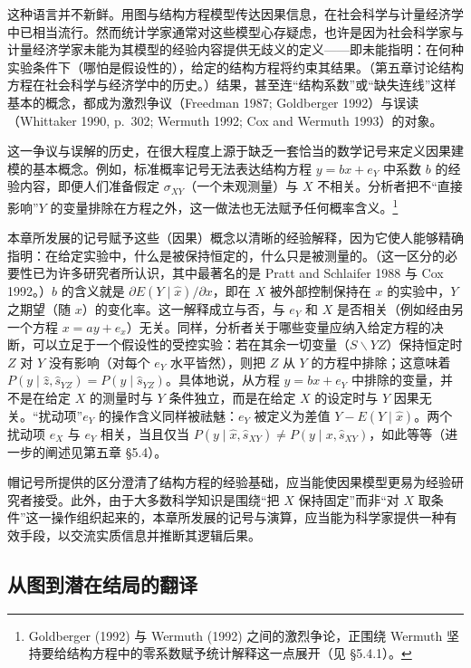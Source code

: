 这种语言并不新鲜。用图与结构方程模型传达因果信息，在社会科学与计量经济学中已相当流行。然而统计学家通常对这些模型心存疑虑，也许是因为社会科学家与计量经济学家未能为其模型的经验内容提供无歧义的定义——即未能指明：在何种实验条件下（哪怕是假设性的），给定的结构方程将约束其结果。（第五章讨论结构方程在社会科学与经济学中的历史。）结果，甚至连“结构系数”或“缺失连线”这样基本的概念，都成为激烈争议（Freedman 1987; Goldberger 1992）与误读（Whittaker 1990, p.~302; Wermuth 1992; Cox and Wermuth 1993）的对象。

这一争议与误解的历史，在很大程度上源于缺乏一套恰当的数学记号来定义因果建模的基本概念。例如，标准概率记号无法表达结构方程 $y=bx+e_Y$ 中系数 $b$ 的经验内容，即便人们准备假定 $\sigma_{XY}$（一个未观测量）与 $X$ 不相关。分析者把不“直接影响”$Y$ 的变量排除在方程之外，这一做法也无法赋予任何概率含义。\footnote{Goldberger (1992) 与 Wermuth (1992) 之间的激烈争论，正围绕 Wermuth 坚持要给结构方程中的零系数赋予统计解释这一点展开（见 \S 5.4.1）。}

本章所发展的记号赋予这些（因果）概念以清晰的经验解释，因为它使人能够精确指明：在给定实验中，什么是被保持恒定的，什么只是被测量的。（这一区分的必要性已为许多研究者所认识，其中最著名的是 Pratt and Schlaifer 1988 与 Cox 1992。）$b$ 的含义就是 $\partial E(Y\mid\hat{x})/\partial x$，即在 $X$ 被外部控制保持在 $x$ 的实验中，$Y$ 之期望（随 $x$）的变化率。这一解释成立与否，与 $e_Y$ 和 $X$ 是否相关（例如经由另一个方程 $x=ay+e_x$）无关。同样，分析者关于哪些变量应纳入给定方程的决断，可以立足于一个假设性的受控实验：若在其余一切变量（$S\backslash YZ$）保持恒定时 $Z$ 对 $Y$ 没有影响（对每个 $e_Y$ 水平皆然），则把 $Z$ 从 $Y$ 的方程中排除；这意味着 $P(y\mid\hat{z},\hat{s}_{YZ})=P(y\mid\hat{s}_{YZ})$。具体地说，从方程 $y=bx+e_Y$ 中排除的变量，并不是在给定 $X$ 的测量时与 $Y$ 条件独立，而是在给定 $X$ 的设定时与 $Y$ 因果无关。“扰动项”$e_Y$ 的操作含义同样被祛魅：$e_Y$ 被定义为差值 $Y-E(Y\mid\hat{x})$。两个扰动项 $e_X$ 与 $e_Y$ 相关，当且仅当 $P(y\mid\hat{x},\hat{s}_{XY})\ne P(y\mid x,\hat{s}_{XY})$，如此等等（进一步的阐述见第五章 \S 5.4）。

帽记号所提供的区分澄清了结构方程的经验基础，应当能使因果模型更易为经验研究者接受。此外，由于大多数科学知识是围绕“把 $X$ 保持固定”而非“对 $X$ 取条件”这一操作组织起来的，本章所发展的记号与演算，应当能为科学家提供一种有效手段，以交流实质信息并推断其逻辑后果。

\subsection{从图到潜在结局的翻译}

